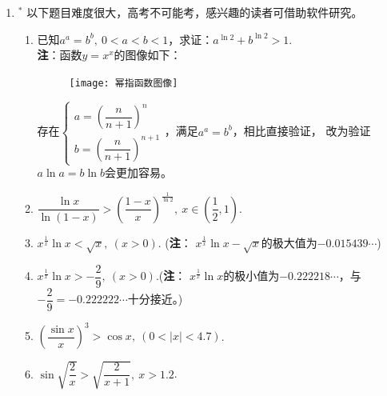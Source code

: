 \begin{enumerate}[label={\textbf{\arabic*.}},leftmargin=
    \inteval{\myenumleftmargin}pt]
\item $ ^* $ 以下题目难度很大，高考不可能考，感兴趣的读者可借助软件研究。
\begin{enumerate}[label={(\arabic*)},itemsep=-1pt]
\item 已知$ a^a=b^b,\ 0<a<b<1 $，求证：$ a^{\ln 2}+b^{\ln2}>1 $. \\
\textbf{注}：函数$ y=x^x $的图像如下：
\begin{figure}[!htbp]
    \centering
    \texttt{[image: 幂指函数图像]}
\end{figure} 
 
存在$\begin{cases}
    a=\left(\dfrac{n}{n+1}\right)^n \\
    b=\left(\dfrac{n}{n+1}\right)^{n+1}
\end{cases}$，满足$a^a=b^b$，相比直接验证，
改为验证$a\ln a=b\ln b$会更加容易。 

\item $ \dfrac{\ln x}{\ln(1-x)}>\left(\dfrac{1-x}{x}\right)^{
    \frac{1}{\ln 2}},\ x\in\left(\dfrac{1}{2},1\right) $. 
\item $ x^{\frac{1}{x}}\ln x<\sqrt{x},\ (x>0) $. (\textbf{注}：
$ x^{\frac{1}{x}}\ln x-\sqrt{x} $的极大值为$ -0.015439\cdots $) 
\item $ x^{\frac{1}{x}}\ln x >-\dfrac{2}{9},\ (x>0) $.(\textbf{注}：
$ x^{\frac{1}{x}}\ln x $的极小值为$ -0.222218\cdots $，与
$ -\dfrac{2}{9}=-0.222222\cdots $十分接近。) 
\item $ \left(\dfrac{\sin x}{x}\right)^3>\cos x,\ (0<|x|<4.7) $.
\item $ \sin\sqrt{\dfrac{2}{x}}>\sqrt{\dfrac{2}{x+1}},\ x>1.2 $.
\end{enumerate}


\end{enumerate}

